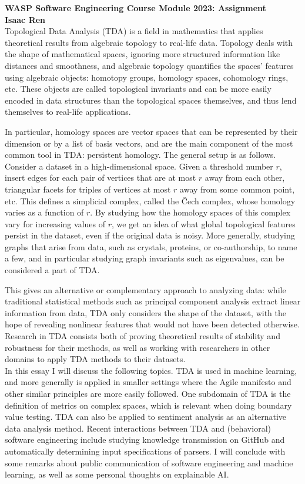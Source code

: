 \documentclass[11pt, oneside]{article}
\begin{document}
\noindent\textbf{WASP Software Engineering Course Module 2023: Assignment} \\
\textbf{Isaac Ren}\\

Topological Data Analysis (TDA) is a field in mathematics that applies theoretical results from algebraic topology to real-life data. Topology deals with the shape of mathematical spaces, ignoring more structured information like distances and smoothness, and algebraic topology quantifies the spaces’ features using algebraic objects: homotopy groups, homology spaces, cohomology rings, etc. These objects are called topological invariants and can be more easily encoded in data structures than the topological spaces themselves, and thus lend themselves to real-life applications.

In particular, homology spaces are vector spaces that can be represented by their dimension or by a list of basis vectors, and are the main component of the most common tool in TDA: persistent homology. The general setup is as follows. Consider a dataset in a high-dimensional space. Given a threshold number $r$, insert edges for each pair of vertices that are at most $r$ away from each other, triangular facets for triples of vertices at most $r$ away from some common point, etc. This defines a simplicial complex, called the Čech complex, whose homology varies as a function of $r$. By studying how the homology spaces of this complex vary for increasing values of $r$, we get an idea of what global topological features persist in the dataset, even if the original data is noisy. More generally, studying graphs that arise from data, such as crystals, proteins, or co-authorship, to name a few, and in particular studying graph invariants such as eigenvalues, can be considered a part of TDA.

This gives an alternative or complementary approach to analyzing data: while traditional statistical methods such as principal component analysis extract linear information from data, TDA only considers the shape of the dataset, with the hope of revealing nonlinear features that would not have been detected otherwise. Research in TDA consists both of proving theoretical results of stability and robustness for their methods, as well as working with researchers in other domains to apply TDA methods to their datasets.\\

In this essay I will discuss the following topics. TDA is used in machine learning, and more generally is applied in smaller settings where the Agile manifesto and other similar principles are more easily followed. One subdomain of TDA is the definition of metrics on complex spaces, which is relevant when doing boundary value testing. TDA can also be applied to sentiment analysis as an alternative data analysis method. Recent interactions between TDA and (behavioral) software engineering include studying knowledge transmission on GitHub and automatically determining input specifications of parsers. I will conclude with some remarks about public communication of software engineering and machine learning, as well as some personal thoughts on explainable AI.\\
\end{document}
